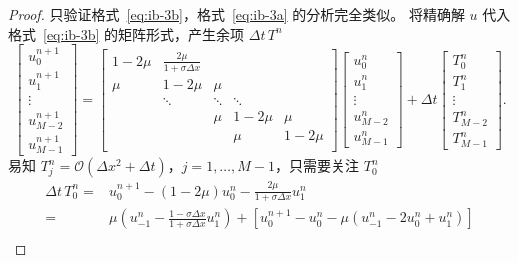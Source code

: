 \begin{proof}
    只验证格式~\eqref{eq:ib-3b}，格式~\eqref{eq:ib-3a} 的分析完全类似。
    将精确解 $u$ 代入格式~\eqref{eq:ib-3b} 的矩阵形式，产生余项 $\Delta t \,T^n$
    \[
        \begin{bmatrix}
            u_0^{n+1} \\ u_1^{n+1} \\ \vdots \\ u_{M-2}^{n+1} \\ u_{M-1}^{n+1}
        \end{bmatrix}
        =
        \begin{bmatrix}
            1-2\mu & \frac{2\mu}{1+\sigma \Delta x} &        &        &        \\
            \mu    & 1-2\mu                         & \mu    &        &        \\
                   & \ddots                         & \ddots & \ddots &        \\
                   &                                & \mu    & 1-2\mu & \mu    \\
                   &                                &        & \mu    & 1-2\mu \\
        \end{bmatrix}
        \begin{bmatrix}
            u_0^{n} \\ u_1^{n} \\ \vdots \\ u_{M-2}^{n} \\ u_{M-1}^{n}
        \end{bmatrix}
        +
        \Delta t
        \begin{bmatrix}
            T_0^{n} \\ T_1^{n} \\ \vdots \\ T_{M-2}^{n} \\ T_{M-1}^{n}
        \end{bmatrix}.
    \]
    易知 $T_j^{n} = \mathcal{O}(\Delta x^2 + \Delta t)$，$j=1,\dots,M-1$，只需要关注 $T_0^{n}$
    \begin{align*}
        \Delta t\, T_0^{n} ={} & u_0^{n+1} - (1-2\mu) u_0^n - \frac{2\mu}{1+\sigma \Delta x} u_1^n            \\
        ={}                    & \mu\left(u_{-1}^n - \frac{1-\sigma \Delta x}{1+\sigma \Delta x} u_1^n\right)
        + \left[
        u_0^{n+1} - u_0^n - \mu(u_{-1}^n - 2 u_0^n + u_1^n)
        \right]                                                                                               \\

\end{align*}
\end{proof}

